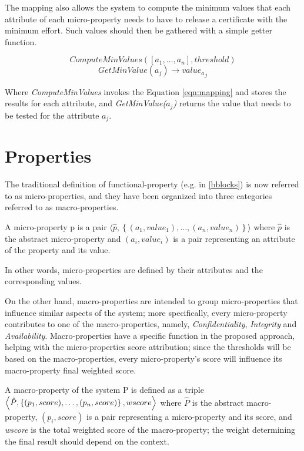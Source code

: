The mapping also allows the system to compute the minimum values that each attribute of each micro-property needs to have to release a certificate with the minimum effort. Such values should then be gathered with a simple getter function.

\[ComputeMinValues([a_1, \dots , a_n], threshold)\]
\[GetMinValue(a_j) \rightarrow {value_a}_j\]

Where \textit{ComputeMinValues} invokes the Equation \ref{eqn:mapping} and stores the results for each attribute, and \textit{GetMinValue(\(a_j\))} returns the value that needs to be tested for the attribute \(a_j\).

\section{Properties}
The traditional definition of functional-property (e.g. in \ref{bblocks}) is now referred to as micro-properties, and they have been organized into three categories referred to as macro-properties.
\begin{defn}
A micro-property p is a pair \(\langle \hat{p}, \left \{  (a_1, value_1), \dots , (a_n, value_n)\right \} \rangle\) 
where \(\hat{p}\) is the abstract micro-property and \(\left ( a_i ,value_i \right )\) is a pair representing an attribute of the property and its value.
\end{defn}

In other words, micro-properties are defined by their attributes and the corresponding values.


On the other hand, macro-properties are intended to group micro-properties that influence similar aspects of the system; more specifically, every micro-property contributes to one of the macro-properties, namely, \textit{Confidentiality}, \textit{Integrity} and \textit{Availability}. Macro-properties have a specific function in the proposed approach, helping with the micro-properties score attribution; since the thresholds will be based on the macro-properties, every micro-property's score will influence its macro-property final weighted score.

\begin{defn}
A macro-property of the system P is defined as a triple \\ \( \Bigl\langle \hat{P}, \left \{(p_1, score), \dots , (p_n, score )\right \}, wscore \Bigr\rangle \) where \(\hat{P}\) is the abstract macro-property, \( \left (p_i, score \right ) \) is a pair representing a micro-property and its score, and \textit{wscore} is the total weighted score of the macro-property; the weight determining the final result should depend on the context.
\end{defn}

